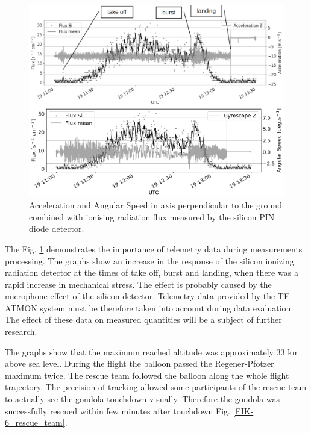 \documentclass{Rpd}
\begin{document}
\begin{figure}%
	\centerline{\includegraphics[width=\columnwidth]{img/FIK-6_metadada.png}}
	\caption{Acceleration and Angular Speed in axis perpendicular to the ground combined with ionising radiation flux measured by the silicon PIN diode detector. \label{FIK-6_telemetry}}
\end{figure}

The Fig. \ref{FIK-6_telemetry} demonstrates the importance of telemetry data during measurements processing. The graphs show an increase in the response of the silicon ionizing radiation detector at the times of take off, burst and landing, when there was a rapid increase in mechanical stress. The effect is probably caused by the microphone effect of the silicon detector. Telemetry data provided by the TF-ATMON system must be therefore taken into account during data evaluation. The effect of these data on measured quantities will be a subject of further research. 


The graphs show that the maximum reached altitude was approximately 33 km above sea level. During the flight the balloon passed the Regener-Pfotzer maximum twice. The rescue team followed the balloon along the whole flight trajectory. The precision of tracking allowed some participants of the rescue team to actually see the gondola touchdown visually. Therefore the gondola was successfully rescued within few minutes after touchdown Fig. \ref{FIK-6_rescue_team}.
\end{document}
